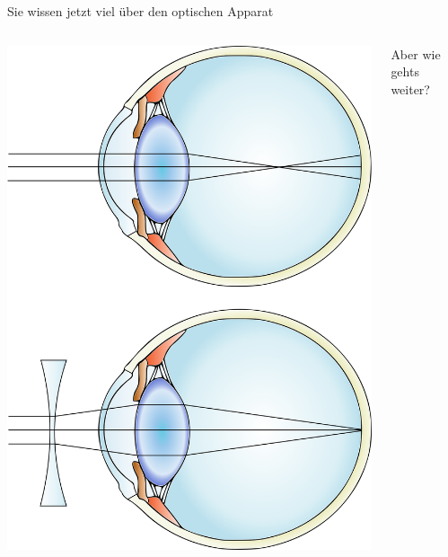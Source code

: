 \documentclass{beamer}
\begin{document}
\begin{frame}{Sie wissen jetzt viel über den optischen Apparat}

\begin{columns}[c]

\begin{column}{5cm}
\begin{center}
    \includegraphics[width=\textwidth]{myopia.png}
\end{center}

\end{column}

\begin{column}{5cm}


\pause

Aber wie gehts weiter?

\end{column}


\end{columns}

    
\end{frame}
\end{document}
